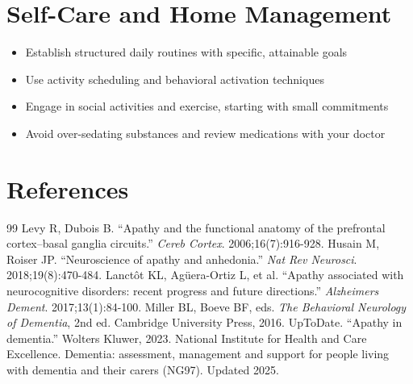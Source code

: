 \section*{Self-Care and Home Management}
\begin{itemize}
 \item Establish structured daily routines with specific, attainable goals
 \item Use activity scheduling and behavioral activation techniques
 \item Engage in social activities and exercise, starting with small commitments
 \item Avoid over-sedating substances and review medications with your doctor
\end{itemize}

\section*{References}
\begin{thebibliography}{99}
 Levy R, Dubois B. ``Apathy and the functional anatomy of the prefrontal cortex--basal ganglia circuits.'' \textit{Cereb Cortex}. 2006;16(7):916-928.
 Husain M, Roiser JP. ``Neuroscience of apathy and anhedonia.'' \textit{Nat Rev Neurosci}. 2018;19(8):470-484.
 Lanctôt KL, Agüera-Ortiz L, et al. ``Apathy associated with neurocognitive disorders: recent progress and future directions.'' \textit{Alzheimers Dement}. 2017;13(1):84-100.
 Miller BL, Boeve BF, eds. \textit{The Behavioral Neurology of Dementia}, 2nd ed. Cambridge University Press, 2016.
 UpToDate. ``Apathy in dementia.'' Wolters Kluwer, 2023.
 National Institute for Health and Care Excellence. Dementia: assessment, management and support for people living with dementia and their carers (NG97). Updated 2025.
\end{thebibliography}

